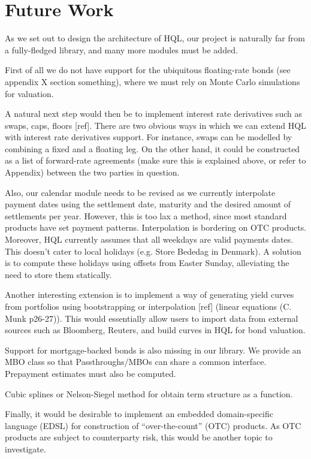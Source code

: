 \chapter{Future Work}

As we set out to design the architecture of HQL, our project is naturally far 
from a fully-fledged library, and many more modules must be added.

First of all we do not have support for the ubiquitous floating-rate bonds (see 
appendix X section something), where we must rely on Monte Carlo simulations 
for valuation.

A natural next step would then be to implement interest rate derivatives such 
as swaps, caps, floors [ref].
There are two obvious ways in which we can extend HQL with interest rate 
derivatives support. For instance, swaps can be modelled by combining a fixed 
and a floating leg. On the other hand, it could be constructed as a list of 
forward-rate agreements (make sure this is explained above, or refer to 
Appendix) between the two parties in question.


Also, our calendar module needs to be revised as we currently interpolate 
payment dates using the settlement date, maturity and the desired amount of 
settlements per year. However, this is too lax a method, since most standard 
products have set payment patterns. Interpolation is bordering on OTC products.
Moreover, HQL currently assumes that all weekdays are valid payments dates. 
This doesn’t cater to local holidays (e.g. Store Bededag in Denmark). A 
solution is to compute these holidays using offsets from Easter Sunday, 
alleviating the need to store them statically.

Another interesting extension is to implement a way of generating yield curves 
from portfolios using bootstrapping or interpolation [ref] (linear equations 
(C. Munk p26-27)). This would essentially allow users to import data from 
external sources such as Bloomberg, Reuters, and build curves in HQL for bond 
valuation.

Support for mortgage-backed bonds is also missing in our library. We provide an 
MBO class so that Passthroughs/MBOs can share a common interface. Prepayment 
estimates must also be computed.

Cubic splines or Nelson-Siegel method for obtain term structure as a function.

Finally, it would be desirable to implement an embedded domain-specific 
language (EDSL) for construction of “over-the-count” (OTC) products.
As OTC products are subject to counterparty risk, this would be another topic 
to investigate.

